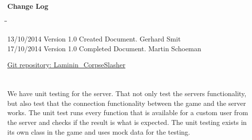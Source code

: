 \documentclass[letterpaper]{article}
\begin{document}
\begin{titlepage}
\begin{center}
\end{center}
\vfill %

\end{titlepage}

	\newpage
	{\LARGE \bf Change Log}\\[2em]
	
	\begin{tabbing}
		\hspace*{2.5cm}\=\hspace*{2.5cm}\=\hspace*{8cm}\=\hspace*{3cm} \kill
		
		13/10/2014 	\> Version 1.0  \> Created Document.									\>Gerhard Smit\\
		17/10/2014 	\> Version 1.0  \> Completed Document.									\> Martin Schoeman\\
		
	\end{tabbing}
	
		\newpage
		\renewcommand\contentsname{TABLE OF CONTENTS}
		\newcommand\contentsnameLC{\colorbox{black}{\makebox[\textwidth-2\fboxsep][l]{\bfseries\color{red} Table of Contents}}}
		
		\renewcommand{\cftdot}{}
		\hypersetup{linktocpage}
		\tableofcontents
		
		\begin{flushleft}
			\LARGE\href{https://github.com/njTaljaard/Laminin_CorpseSlasher/}{Git repository: Laminin\_CorpseSlasher}
		\end{flushleft}
		
	\newpage
	
	\section*{\colorbox{black}{}} 
	\vspace{0.1in}
	
	We have unit testing for the server. That not only test the servers functionality, but also test that the connection functionality between the game and the server works. The unit test runs every function that is available for a custom user from the server and checks if the result is what is expected. The unit testing exists in its own class in the game and uses mock data for the testing.
	
\end{document}
